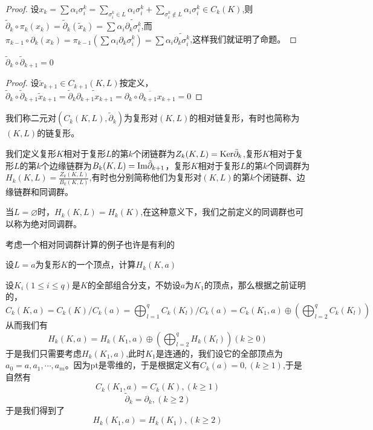 \begin{proof}
设$x_{k}=\sum\alpha_{i}\sigma^{k}_{i}=\sum\limits_{\sigma^{k}_{i}\in L}\alpha_{i}\sigma_{i}^{k}+\sum\limits_{\sigma^{k}_{i}\notin L}\alpha_{i}\sigma_{i}^{k}\in C_{k}(K)$,则$\tilde{\partial}_{k}\circ\pi_{k}(x_{k})=\tilde{\partial}_{k}(\tilde{x}_{k})=\sum\alpha_{i}\widetilde{\partial_{k}\sigma^{k}_{i}}$,而$\pi_{k-1}\circ \partial_{k}(x_{k})=\pi_{k-1}(\sum\alpha_{i}\partial_{k}\sigma_{i}^{k})=\sum\alpha_{i}\widetilde{\partial_{k}\sigma^{k}_{i}}$,这样我们就证明了命题。
\end{proof}
\begin{proposition}\label{chap3_pro_32}
$\tilde{\partial}_{k}\circ\tilde{\partial}_{k+1}=0 $
\end{proposition}
\begin{proof}
设$\tilde{x}_{k+1}\in C_{k+1}(K,L)$按定义，$\tilde{\partial}_{k}\circ\tilde{\partial}_{k+1}\tilde{x}_{k+1}=\tilde{\partial}_{k}\widetilde{\partial_{k+1}x_{k+1}}=\overline{\partial_{k}\circ\partial_{k+1}x_{k+1}}=0$
\end{proof}
\begin{definition}
我们称二元对$(C_{k}(K,L),\tilde{\partial}_{k})$为复形对$(K,L)$的相对链复形，有时也简称为$(K,L)$的链复形。
\end{definition}
\begin{definition}
我们定义复形$K$相对于复形$L$的第$k$个闭链群为$Z_{k}(K,L)={\rm Ker} \tilde{\partial}_{k}$,复形$K$相对于复形$L$的第$k$个边缘链群为$B_{k}(K,L)={\rm Im} \tilde{\partial}_{k+1}$，复形$K$相对于复形$L$的第$k$个同调群为$H_{k}(K,L)=\frac{Z_{k}(K,L)}{B_{k}(K,L)}$,有时也分别简称他们为复形对$(K,L)$的第$k$个闭链群、边缘链群和同调群。
\end{definition}
\begin{remark}
当$L=\varnothing$时，$H_{k}(K,L)=H_{k}(K)$,在这种意义下，我们之前定义的同调群也可以称为绝对同调群。
\end{remark}
考虑一个相对同调群计算的例子也许是有利的
\begin{example}
设$L=a$为复形$K$的一个顶点，计算$H_{k}(K,a)$
\end{example}
设$K_{i}(1\leq i\leq q)$是$K$的全部组合分支，不妨设$a$为$K_{1}$的顶点，那么根据之前证明的，$$C_{k}(K,a)=C_{k}(K)/C_{k}(a)=\bigoplus_{l=1}^{q}C_{k}(K_{l})/C_{k}(a)=C_{k}(K_{1},a)\oplus\left(\bigoplus_{l=2}^{q}C_{k}(K_{l})\right)$$从而我们有$$H_{k}(K,a)=H_{k}(K_{1},a)\oplus\left(\bigoplus_{l=2}^{q}H_{k}(K_{l})\right)(k\geq 0)$$于是我们只需要考虑$H_{k}(K_{1},a)$,此时$K_{1}$是连通的，我们设它的全部顶点为$a_{0}=a,a_{1},\cdots,a_{m}$。因为pt是零维的，于是根据定义有$C_{k}(a)=0,(k\geq 1)$,于是自然有$$C_{k}(K_{1},a)=C_{k}(K),(k\geq 1)$$$$\tilde{\partial}_{k}=\partial_{k},(k\geq 2)$$于是我们得到了$$H_{k}(K_{1},a)=H_{k}(K_{1}),(k\geq 2)$$
